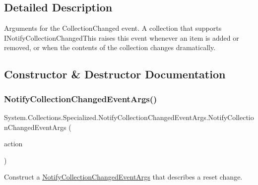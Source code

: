 \subsection{Detailed Description}
Arguments for the Collection\+Changed event. A collection that supports I\+Notify\+Collection\+Changed\+This raises this event whenever an item is added or removed, or when the contents of the collection changes dramatically. 



\subsection{Constructor \& Destructor Documentation}
\mbox{\label{class_system_1_1_collections_1_1_specialized_1_1_notify_collection_changed_event_args_a55e91ab8b8545057ce857e986f5e173a}} 
\subsubsection{\texorpdfstring{Notify\+Collection\+Changed\+Event\+Args()}{NotifyCollectionChangedEventArgs()}\hspace{0.1cm}{\footnotesize\ttfamily [1/11]}}
{\footnotesize\ttfamily System.\+Collections.\+Specialized.\+Notify\+Collection\+Changed\+Event\+Args.\+Notify\+Collection\+Changed\+Event\+Args (\begin{DoxyParamCaption}\item[{\hyperlink{namespace_system_1_1_collections_1_1_specialized_a7e21ea761562ed22011c3120bbb31123}{Notify\+Collection\+Changed\+Action}}]{action }\end{DoxyParamCaption})\hspace{0.3cm}{\ttfamily [inline]}}



Construct a \hyperlink{class_system_1_1_collections_1_1_specialized_1_1_notify_collection_changed_event_args}{Notify\+Collection\+Changed\+Event\+Args} that describes a reset change. 


